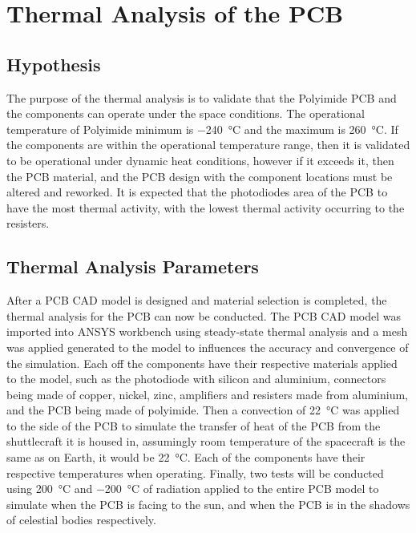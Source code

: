 \section{Thermal Analysis of the PCB}

\subsection{Hypothesis}
The purpose of the thermal analysis is to validate that the Polyimide
PCB and the components can operate under the space conditions. The
operational temperature of Polyimide minimum is \SI{-240}{\celsius} and the maximum
is \SI{260}{\celsius}. If the components are within the operational temperature
range, then it is validated to be operational under dynamic heat
conditions, however if it exceeds it, then the PCB material, and the PCB
design with the component locations must be altered and reworked. It is
expected that the photodiodes area of the PCB to have the most thermal
activity, with the lowest thermal activity occurring to the resisters.

\subsection{Thermal Analysis Parameters}
After a PCB CAD model is designed and material selection is completed,
the thermal analysis for the PCB can now be conducted. The PCB CAD model
was imported into ANSYS workbench using steady-state thermal analysis
and a mesh was applied generated to the model to influences the accuracy
and convergence of the simulation. Each off the components have their
respective materials applied to the model, such as the photodiode with
silicon and aluminium, connectors being made of copper, nickel, zinc,
amplifiers and resisters made from aluminium, and the PCB being made of
polyimide. Then a convection of \SI{22}{\celsius} was applied to the side of the PCB
to simulate the transfer of heat of the PCB from the shuttlecraft it is
housed in, assumingly room temperature of the spacecraft is the same as
on Earth, it would be \SI{22}{\celsius}. Each of the components have their respective
temperatures when operating. Finally, two tests will be conducted using
\SI{200}{\celsius} and \SI{-200}{\celsius} of radiation applied to the entire PCB model to
simulate when the PCB is facing to the sun, and when the PCB is in the
shadows of celestial bodies respectively.

